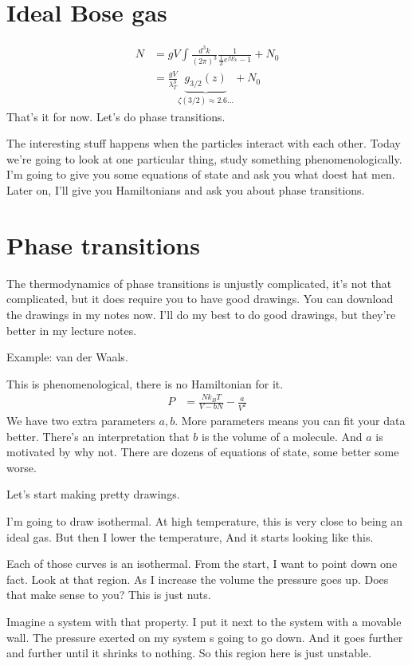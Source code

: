 \section{Ideal Bose gas}
\begin{align}
    N &= gV \int \frac{d^3k}{\left( 2\pi \right)^3}
    \frac{1}{\frac{1}{Z} e^{\beta E_{k}} - 1}
    + N_0\\
    &=
    \frac{gV}{\lambda_T^3} \underbrace{g_{3/2}(z)}_{\zeta(3/2)\approx 2.6\ldots}
    + N_0
\end{align}
That's it for now.
Let's do phase transitions.

The interesting stuff happens when the particles interact with each other.
Today we're going to look at one particular thing,
study something phenomenologically.
I'm going to give you some equations of state and ask you what doest hat men.
Later on,
I'll give you Hamiltonians and ask you about phase transitions.


\section{Phase transitions}
The thermodynamics of phase transitions is unjustly complicated,
it's not that complicated,
but it does require you to have good drawings.
You can download the drawings in my notes now.
I'll do my best to do good drawings,
but they're better in my lecture notes.

Example: van der Waals.

This is phenomenological,
there is no Hamiltonian for it.
\begin{align}
    P
    &=
    \frac{N k_B T}{V - bN} - \frac{a}{V^2}
\end{align}
We have two extra parameters $a,b$.
More parameters means you can fit your data better.
There's an interpretation that $b$ is the volume of a molecule.
And $a$ is motivated by why not.
There are dozens of equations of state,
some better some worse.

Let's start making pretty drawings.

I'm going to draw isothermal.
At high temperature,
this is very close to being an ideal gas.
But then I lower the temperature,
And it starts looking like this.

Each of those curves is an isothermal.
From the start,
I want to point down one fact.
Look at that region.
As I increase the volume the pressure goes up.
Does that make sense to you?
This is just nuts.

Imagine a system with that property.
I put it next to the system with a movable wall.
The pressure exerted on my system s going to go down.
And it goes further and further until it shrinks to nothing.
So this region here is just unstable.

